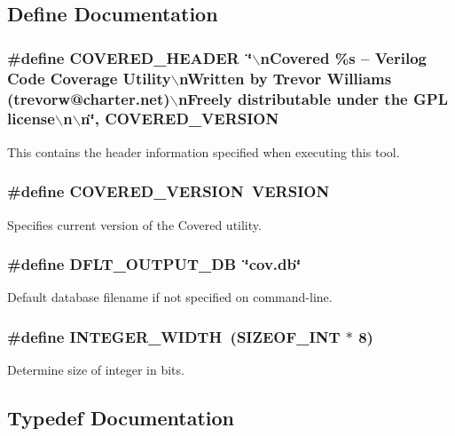 \subsection{Define Documentation}
\subsubsection{\setlength{\rightskip}{0pt plus 5cm}\#define COVERED\_\-HEADER\ \char`\"{}$\backslash$n\-Covered \%s -- Verilog Code Coverage Utility$\backslash$n\-Written by Trevor Williams  (trevorw@charter.net)$\backslash$n\-Freely distributable under the GPL license$\backslash$n$\backslash$n\char`\"{}, COVERED\_\-VERSION}\label{defines_8h_a1}


This contains the header information specified when executing this tool. 
\subsubsection{\setlength{\rightskip}{0pt plus 5cm}\#define COVERED\_\-VERSION\ VERSION}\label{defines_8h_a0}


Specifies current version of the Covered utility. 
\subsubsection{\setlength{\rightskip}{0pt plus 5cm}\#define DFLT\_\-OUTPUT\_\-DB\ \char`\"{}cov.db\char`\"{}}\label{defines_8h_a2}


Default database filename if not specified on command-line. 
\subsubsection{\setlength{\rightskip}{0pt plus 5cm}\#define INTEGER\_\-WIDTH\ (SIZEOF\_\-INT $\ast$ 8)}\label{defines_8h_a3}


Determine size of integer in bits. 

\subsection{Typedef Documentation}
